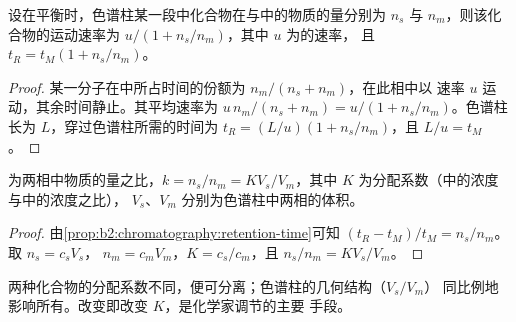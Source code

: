 \begin{proposition}[保留时间]\label{prop:b2:chromatography:retention-time}
设在平衡时，色谱柱某一段中化合物在与中的物质的量分别为
$n_s$ 与 $n_m$，则该化合物的运动速率为 $u/(1 + n_s/n_m)$，其中 $u$ 为的速率，
且 $t_R = t_M(1 + n_s/n_m)$。
\end{proposition}

\begin{proof}
某一分子在中所占时间的份额为 $n_m/(n_s + n_m)$，在此相中以
速率 $u$ 运动，其余时间静止。其平均速率为 $u\,n_m/(n_s + n_m) = u/(1 + n_s/n_m)$。色谱柱
长为 $L$，穿过色谱柱所需的时间为 $t_R = (L/u)(1 + n_s/n_m)$，且 $L/u = t_M$。
\end{proof}

\begin{proposition}[保留与分配]\label{prop:b2:chromatography:k-and-K}
为两相中物质的量之比，$k = n_s/n_m = KV_s/V_m$，其中 $K$
为分配系数（中的浓度与中的浓度之比），
$V_s$、$V_m$ 分别为色谱柱中两相的体积。
\end{proposition}

\begin{proof}
由\cref{prop:b2:chromatography:retention-time}可知 $(t_R - t_M)/t_M = n_s/n_m$。取 $n_s = c_sV_s$，
$n_m = c_mV_m$，$K = c_s/c_m$，且 $n_s/n_m = KV_s/V_m$。
\end{proof}

两种化合物的分配系数不同，便可分离；色谱柱的几何结构（$V_s/V_m$）
同比例地影响所有。改变即改变 $K$，是化学家调节的主要
手段。

